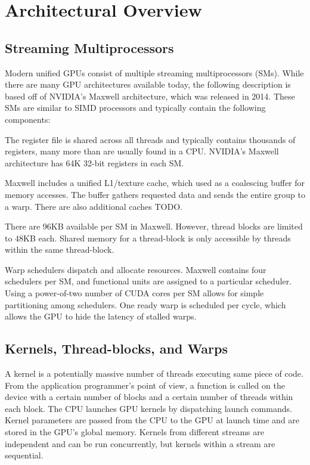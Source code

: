\documentclass[prodmode,acmtecs]{acmsmall} %
\begin{document}
\section{Architectural Overview} \label{sec:architecture}
\subsection{Streaming Multiprocessors}
Modern unified GPUs consist of multiple streaming multiprocessors (SMs). While
there are many GPU architectures available today, the following description is
based off of NVIDIA's Maxwell architecture, which was released in 2014. These
SMs are similar to SIMD processors and typically contain the following
components:
\begin{description}
  \setlength\itemsep{1em}
  \item[A large register file] The register file is shared across all threads
  and typically contains thousands of registers, many more than are usually
  found in a CPU. NVIDIA's Maxwell architecture has 64K 32-bit registers in each
  SM.
  \item[Multiple caches] Maxwell includes a unified L1/texture cache, which used
  as a coalescing buffer for memory accesses. The buffer gathers requested data
  and sends the entire group to a warp. There are also additional caches TODO.
  \item[Shared memory] There are 96KB available per SM in Maxwell. However,
  thread blocks are limited to 48KB each. Shared memory for a thread-block is
  only accessible by threads within the same thread-block.
  \item[Multiple warp schedulers] Warp schedulers dispatch and allocate
  resources. Maxwell contains four schedulers per SM, and functional units are
  assigned to a particular scheduler. Using a power-of-two number of CUDA cores
  per SM allows for simple partitioning among schedulers. One ready warp is
  scheduled per cycle, which allows the GPU to hide the latency of stalled
  warps.
\end{description}

\subsection{Kernels, Thread-blocks, and Warps}
A kernel is a potentially massive number of threads executing same piece of
code. From the application programmer's point of view, a function is called on
the device with a certain number of blocks and a certain number of threads
within each block. The CPU launches GPU kernels by dispatching launch commands.
Kernel parameters are passed from the CPU to the GPU at launch time and are
stored in the GPU's global memory. Kernels from different streams are
independent and can be run concurrently, but kernels within a stream are
sequential.
\end{document}
